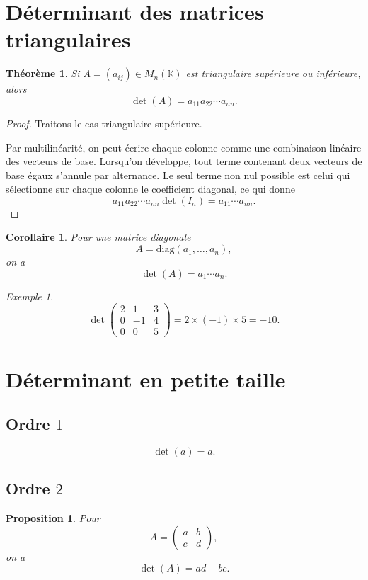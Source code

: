\documentclass[11pt,a4paper]{article}
\newtheorem{theoreme}[definition]{Théorème}
\newtheorem{proposition}[definition]{Proposition}
\newtheorem{corollaire}[definition]{Corollaire}
\theoremstyle{remark}
\newtheorem{exemple}[definition]{Exemple}
\newcommand{\K}{\mathbb{K}}
\begin{document}
\section{Déterminant des matrices triangulaires}

\begin{theoreme}
Si \(A=(a_{ij})\in M_n(\K)\) est triangulaire supérieure ou inférieure, alors
\[
\det(A)=a_{11}a_{22}\cdots a_{nn}.
\]
\end{theoreme}

\begin{proof}
Traitons le cas triangulaire supérieure.

Par multilinéarité, on peut écrire chaque colonne comme une combinaison linéaire des vecteurs de base. Lorsqu’on développe, tout terme contenant deux vecteurs de base égaux s’annule par alternance. Le seul terme non nul possible est celui qui sélectionne sur chaque colonne le coefficient diagonal, ce qui donne
\[
a_{11}a_{22}\cdots a_{nn}\det(I_n)=a_{11}\cdots a_{nn}.
\]
\end{proof}

\begin{corollaire}
Pour une matrice diagonale
\[
A=\mathrm{diag}(a_1,\dots,a_n),
\]
on a
\[
\det(A)=a_1\cdots a_n.
\]
\end{corollaire}

\begin{exemple}
\[
\det\begin{pmatrix}
2 & 1 & 3\\
0 & -1 & 4\\
0 & 0 & 5
\end{pmatrix}
=2\times(-1)\times 5=-10.
\]
\end{exemple}

\section{Déterminant en petite taille}

\subsection{Ordre \(1\)}

\[
\det(a)=a.
\]

\subsection{Ordre \(2\)}

\begin{proposition}
Pour
\[
A=
\begin{pmatrix}
a & b\\
c & d
\end{pmatrix},
\]
on a
\[
\det(A)=ad-bc.
\]
\end{proposition}
\end{document}
